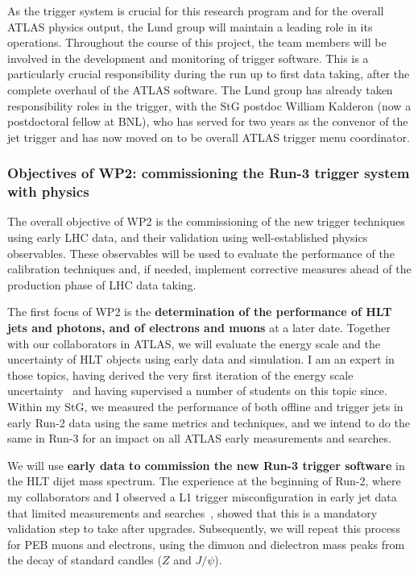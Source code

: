 As the trigger system is crucial for this research program and for the overall ATLAS physics output, the Lund group will maintain a leading role in its operations. 
Throughout the course of this project, the team members will be involved in the development and monitoring of trigger software. 
This is a particularly crucial responsibility during the run up to first data taking, after the complete overhaul of the ATLAS software. 
The Lund group has already taken responsibility roles in the trigger, with the StG postdoc William Kalderon (now a postdoctoral fellow at BNL), who has served for two years as the convenor of the jet trigger and has now moved on to be overall ATLAS trigger menu coordinator. 

\subsubsection{Objectives of WP2: commissioning the Run-3 trigger system with physics}

The overall objective of WP2 is the commissioning of the new trigger techniques using early LHC data, and their validation using well-established physics observables. 
These observables will be used to evaluate the performance of the calibration techniques and, if needed, implement corrective measures ahead of the production phase of LHC data taking. 

The first focus of WP2 is the \textbf{determination of the performance of HLT jets and photons, and of electrons and muons} at a later date. 
Together with our collaborators in ATLAS, we will evaluate the energy scale and the uncertainty of HLT objects using early data and simulation. 
I am an expert in those topics, having derived the very first iteration of the energy scale uncertainty~\cite{ToBeCited} %
and having supervised a number of students on this topic since. 
Within my StG, we measured the performance of both offline and trigger jets in early Run-2 data using the same metrics and techniques, 
and we intend to do the same in Run-3 for an impact on all ATLAS early measurements and searches.  

We will use \textbf{early data to commission the new Run-3 trigger software} in the HLT dijet mass spectrum. 
The experience at the beginning of Run-2, where my collaborators and I observed a L1 trigger misconfiguration in early jet data that limited measurements and searches~\cite{Collaboration:2035503}, showed that this is a mandatory validation step to take after upgrades. 
Subsequently, we will repeat this process for PEB muons and electrons, using the dimuon and dielectron mass peaks from the decay of standard candles ($Z$ and $J/\psi$). 


